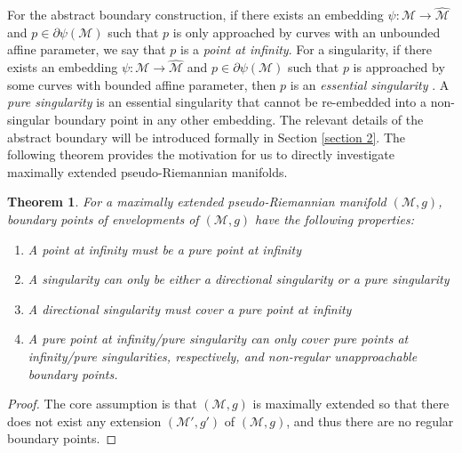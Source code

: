 \documentclass[pdflatex,sn-mathphys-num]{sn-jnl}
\newtheorem{theorem}{Theorem}[section]
\theoremstyle{definition}
\begin{document}
For the abstract boundary construction, if there exists an embedding $\psi: \mathcal{M} \rightarrow \hat{\mathcal{M}}$ and $p \in \partial\psi(\mathcal{M})$ such that $p$ is only approached by curves with an unbounded affine parameter, we say that $p$ is a \textit{point at infinity}. For a singularity, if there exists an embedding $\psi: \mathcal{M} \rightarrow \hat{\mathcal{M}}$ and $p \in \partial\psi(\mathcal{M})$ such that $p$ is approached by some curves with bounded affine parameter, then $p$ is an \textit{essential singularity} \cite{scott1994abstract}. A \textit{pure singularity} is an essential singularity that cannot be re-embedded into a non-singular boundary point in any other embedding. The relevant details of the abstract boundary will be introduced formally in Section \ref{section 2}. The following theorem provides the motivation for us to directly investigate maximally extended pseudo-Riemannian manifolds.
\begin{theorem}\label{theorem:1}
For a maximally extended pseudo-Riemannian manifold $(\mathcal{M},g)$, boundary points of envelopments of $(\mathcal{M},g)$  have the following properties: \begin{enumerate}
        \item A point at infinity must be a pure point at infinity
        \item A singularity can only be either a directional singularity or a pure singularity
        \item A directional singularity must cover a pure point at infinity
        \item A pure point at infinity/pure singularity can only cover pure points at infinity/pure singularities, respectively, and non-regular unapproachable boundary points.
    \end{enumerate}
\end{theorem}
\begin{proof}
    The core assumption is that $(\mathcal{M},g)$ is maximally extended so that there does not exist any extension $(\mathcal{M}',g')$ of $(\mathcal{M},g)$, and thus there are no regular boundary points.
\end{proof}

\end{document}
